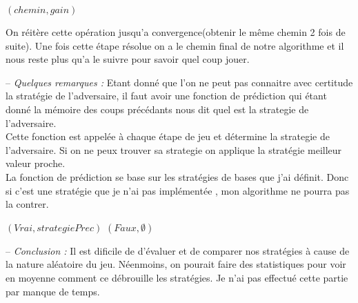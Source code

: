 \documentclass[11pt]{article}
\begin{document}
\SetAlgoVlined
\begin{algorithm}
    \Retour $(chemin, gain)$
\end{algorithm}

On réitère cette opération jusqu'a convergence(obtenir le même chemin 2 fois de suite).
Une fois cette étape résolue on a le chemin final de notre algorithme et il nous reste plus qu'a le suivre pour savoir quel coup jouer. 

-- {\itshape Quelques remarques :}
Etant donné que l'on ne peut pas connaitre avec certitude la stratégie de l'adversaire, il faut avoir une fonction de prédiction qui étant donné la mémoire des coups précédants nous dit quel est la strategie de l'adversaire. \\
Cette fonction est appelée à chaque étape de jeu et détermine la strategie de l'adversaire. Si on ne peux trouver sa strategie on applique la stratégie meilleur valeur proche. \\
La fonction de prédiction se base sur les stratégies de bases que j'ai définit. Donc si c'est une stratégie que je n'ai pas implémentée , mon algorithme ne pourra pas la contrer.


\SetAlgoVlined
\begin{algorithm}
      {\Retour $(Vrai, strategiePrec)$}
    \Retour $(Faux, \emptyset)$
\end{algorithm}

-- {\itshape Conclusion :}
Il est dificile de d'évaluer et de comparer nos stratégies à cause de la nature aléatoire du jeu. Néenmoins, on pourait faire des statistiques pour voir en moyenne comment ce débrouille les stratégies. Je n'ai pas effectué cette partie par manque de temps.
\end{document}
